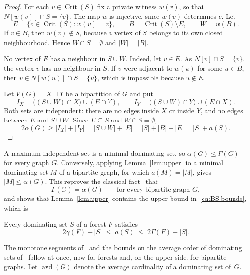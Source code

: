 \documentclass[smallextended,envcountsect,envcountsame]{svjour3}
\newcommand{\Crit}{\operatorname{Crit}}
\begin{document}
\begin{proof}
For each $v\in\Crit(S)$ fix a private witness $w(v)$, so that
$N[w(v)]\cap S=\{v\}$. The map $w$ is injective, since $w(v)$ determines $v$.
Let
\begingroup\small\[
  E=\{v\in\Crit(S): w(v)=v\},\qquad B=\Crit(S)\setminus E,\qquad W=w(B).
\]\endgroup
If $v\in B$, then $w(v)\notin S$, because a vertex of $S$ belongs to its own
closed neighbourhood. Hence $W\cap S=\emptyset$ and $|W|=|B|$.

No vertex of $E$ has a neighbour in $S\cup W$. Indeed, let $v\in E$. As
$N[v]\cap S=\{v\}$, the vertex $v$ has no neighbour in $S$. If $v$ were
adjacent to $w(u)$ for some $u\in B$, then $v\in N[w(u)]\cap S=\{u\}$, which
is impossible because $u\notin E$.

Let $V(G)=X\sqcup Y$ be a bipartition of $G$ and put
\begingroup\small\[
  I_X=\bigl((S\cup W)\cap X\bigr)\cup(E\cap Y),\qquad
  I_Y=\bigl((S\cup W)\cap Y\bigr)\cup(E\cap X).
\]\endgroup
Both sets are independent: there are no edges inside $X$ or inside $Y$, and
no edges between $E$ and $S\cup W$. Since $E\subseteq S$ and $W\cap
S=\emptyset$,
\begingroup\small\[
  2\alpha(G)\ge|I_X|+|I_Y|=|S\cup W|+|E|=|S|+|B|+|E|=|S|+a(S). 
\]\endgroup
\end{proof}

A maximum independent set is a minimal dominating set, so
$\alpha(G)\le\Gamma(G)$ for every graph $G$. Conversely, applying
Lemma~\ref{lem:upper} to a minimal dominating set $M$ of a bipartite graph,
for which $a(M)=|M|$, gives $|M|\le\alpha(G)$. This reproves the classical
fact~\cite{CFPT} that
\begingroup\small\begin{equation}\label{eq:alpha-Gamma}
  \Gamma(G)=\alpha(G)\qquad\text{for every bipartite graph } G,
\end{equation}\endgroup
and shows that Lemma~\ref{lem:upper} contains the upper bound
in~\eqref{eq:BS-bounds}, which is \cite[Lemma~15]{BS}.

\begin{corollary}\label{cor:twosided}
Every dominating set $S$ of a forest $F$ satisfies
\begingroup\small\begin{equation}\label{eq:twosided}
  2\gamma(F)-|S|\;\le\;a(S)\;\le\;2\Gamma(F)-|S| .
\end{equation}\endgroup
\end{corollary}

The monotone segments of~\cite[Theorems~6 and~16]{BS} and the bounds on the
average order of dominating sets of~\cite[Theorem~18]{BS} follow at once,
now for forests and, on the upper side, for bipartite graphs. Let
$\operatorname{avd}(G)$ denote the average cardinality of a dominating set
of~$G$.
\end{document}
